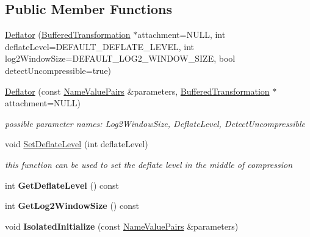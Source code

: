 \subsection*{Public Member Functions}
\begin{DoxyCompactItemize}
\item 
\hyperlink{class_deflator_aee81a8ccc99647834b079bbcb70e4027}{Deflator} (\hyperlink{class_buffered_transformation}{BufferedTransformation} $\ast$attachment=NULL, int deflateLevel=DEFAULT\_\-DEFLATE\_\-LEVEL, int log2WindowSize=DEFAULT\_\-LOG2\_\-WINDOW\_\-SIZE, bool detectUncompressible=true)
\item 
\hypertarget{class_deflator_ac8cc60904628ddbd604458c2fbf15632}{
\hyperlink{class_deflator_ac8cc60904628ddbd604458c2fbf15632}{Deflator} (const \hyperlink{class_name_value_pairs}{NameValuePairs} \&parameters, \hyperlink{class_buffered_transformation}{BufferedTransformation} $\ast$attachment=NULL)}
\label{class_deflator_ac8cc60904628ddbd604458c2fbf15632}

\begin{DoxyCompactList}\small\item\em possible parameter names: Log2WindowSize, DeflateLevel, DetectUncompressible \item\end{DoxyCompactList}\item 
\hypertarget{class_deflator_a5b19de812080b7b12d0a6cc974f60b33}{
void \hyperlink{class_deflator_a5b19de812080b7b12d0a6cc974f60b33}{SetDeflateLevel} (int deflateLevel)}
\label{class_deflator_a5b19de812080b7b12d0a6cc974f60b33}

\begin{DoxyCompactList}\small\item\em this function can be used to set the deflate level in the middle of compression \item\end{DoxyCompactList}\item 
\hypertarget{class_deflator_a729515d987b90f5306cf624769b8711f}{
int {\bfseries GetDeflateLevel} () const }
\label{class_deflator_a729515d987b90f5306cf624769b8711f}

\item 
\hypertarget{class_deflator_ac502e068d669e9a15ed1358f7b9075e0}{
int {\bfseries GetLog2WindowSize} () const }
\label{class_deflator_ac502e068d669e9a15ed1358f7b9075e0}

\item 
\hypertarget{class_deflator_ac9f545b8062a7e822e537364ef422111}{
void {\bfseries IsolatedInitialize} (const \hyperlink{class_name_value_pairs}{NameValuePairs} \&parameters)}
\label{class_deflator_ac9f545b8062a7e822e537364ef422111}


\end{DoxyCompactItemize}
